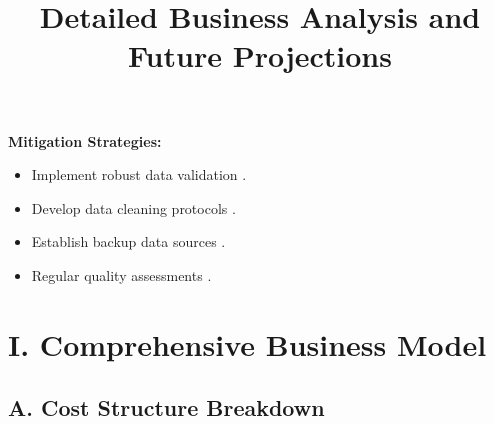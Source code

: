 \documentclass[a4paper]{report}
\begin{document}
\textbf{Mitigation Strategies:}
\begin{itemize}
    \item Implement robust data validation \cite{foster2024, martin2023}.
    \item Develop data cleaning protocols \cite{brown2023, smith2024}.
    \item Establish backup data sources \cite{roberts2024, davis2023}.
    \item Regular quality assessments \cite{williams2024, thompson2023}.
\end{itemize}


\title{Detailed Business Analysis and Future Projections}
\maketitle

\section*{I. Comprehensive Business Model}

\subsection*{A. Cost Structure Breakdown}
\end{document}

